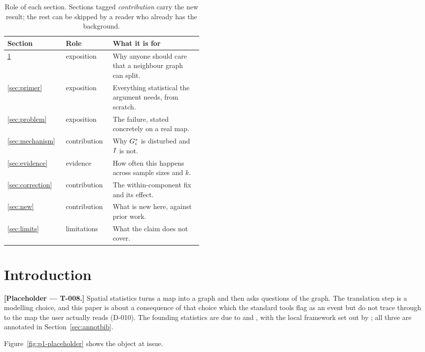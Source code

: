 \documentclass[11pt,a4paper]{article}
\begin{document}
\begin{table}[htbp]
  \centering
  \begin{tabular}{@{}llp{0.46\linewidth}@{}}
    \toprule
    Section & Role & What it is for \\
    \midrule
    \ref{sec:intro}      & exposition   & Why anyone should care that a neighbour graph can split. \\
    \ref{sec:primer}     & exposition   & Everything statistical the argument needs, from scratch. \\
    \ref{sec:problem}    & exposition   & The failure, stated concretely on a real map. \\
    \ref{sec:mechanism}  & contribution & Why $G_i^{*}$ is disturbed and $I$ is not. \\
    \ref{sec:evidence}   & evidence     & How often this happens across sample sizes and $k$. \\
    \ref{sec:correction} & contribution & The within-component fix and its effect. \\
    \ref{sec:new}        & contribution & What is new here, against prior work. \\
    \ref{sec:limits}     & limitations  & What the claim does not cover. \\
    \bottomrule
  \end{tabular}
  \caption{Role of each section. Sections tagged \emph{contribution} carry the
    new result; the rest can be skipped by a reader who already has the
    background.}
  \label{tab:roadmap}
\end{table}

\section{Introduction\EXPOSITION}
\label{sec:intro}

\textbf{[Placeholder --- T-008.]} Spatial statistics turns a map into a graph and
then asks questions of the graph. The translation step is a modelling choice, and
this paper is about a consequence of that choice which the standard tools flag as
an event but do not trace through to the map the user actually reads (D-010).
The founding statistics are due to \citet{moran1950} and
\citet{getisord1992}, with the local framework set out by \citet{anselin1995};
all three are annotated in Section~\ref{sec:annotbib}.

Figure~\ref{fig:p1-placeholder} shows the object at issue.
\end{document}

